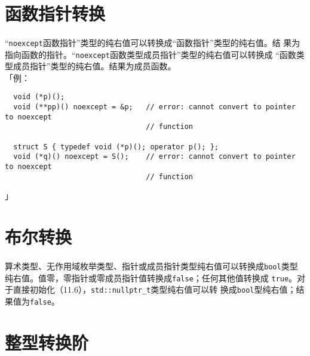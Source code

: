 \section{函数指针转换}
\paragraph{}
``\texttt{noexcept}函数指针''类型的纯右值可以转换成``函数指针''类型的纯右值。结
果为指向函数的指针。``\texttt{noexcept}函数类型成员指针''类型的纯右值可以转换成
``函数类型成员指针''类型的纯右值。结果为成员函数。                            \\
「例：
\begin{lstlisting}
  void (*p)();
  void (**pp)() noexcept = &p;   // error: cannot convert to pointer to noexcept
                                 // function

  struct S { typedef void (*p)(); operator p(); };
  void (*q)() noexcept = S();    // error: cannot convert to pointer to noexcept
                                 // function
\end{lstlisting}」

\section{布尔转换}
\paragraph{}
算术类型、无作用域枚举类型、指针或成员指针类型纯右值可以转换成\texttt{bool}类型
纯右值。值零，零指针或零成员指针值转换成\texttt{false}；任何其他值转换成
\texttt{true}。对于直接初始化（11.6），\texttt{std::nullptr\_t}类型纯右值可以转
换成\texttt{bool}型纯右值；结果值为\texttt{false}。

\section{整型转换阶}
